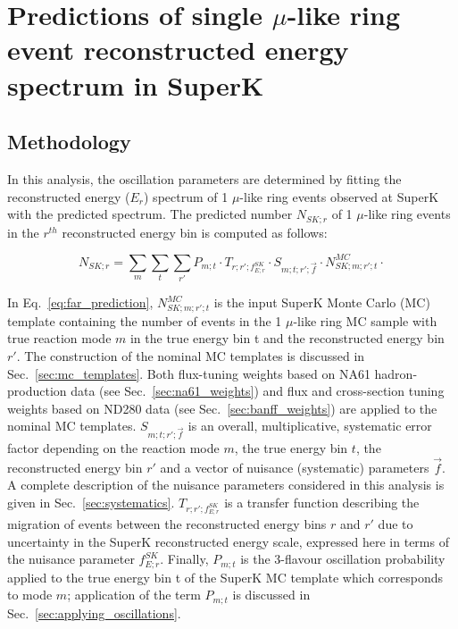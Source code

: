 \clearpage

\section {Predictions of single $\mu$-like ring event reconstructed energy spectrum in SuperK}
\label{sec:spectrum_prediction}

\subsection {Methodology}

In this analysis, 
the oscillation parameters are determined 
by fitting the reconstructed energy ($E_{r}$) spectrum
of 1 $\mu$-like ring events observed at SuperK with the predicted spectrum.
The predicted number $N_{SK;r}$ 
of 1 $\mu$-like ring events in the $r^{th}$ reconstructed energy bin
is computed as follows:

\begin{equation}
\displaystyle
  N_{SK;r} = 
    \sum_{m} \sum_{t} \sum_{r\prime}
        P_{m;t} \cdot
        T_{r;r\prime;f_{E; r}^{SK}} \cdot
        S_{m;t;r\prime;\vec{f}} \cdot
        N_{SK;m;r\prime;t}^{MC} \cdot
\label{eq:far_prediction}
\end{equation}

In Eq.\ \ref{eq:far_prediction}, $N_{SK;m;r\prime;t}^{MC}$ is the input SuperK Monte Carlo (MC) template 
containing the number of events in the 1 $\mu$-like ring MC sample with true reaction mode $m$ in the 
true energy bin t and the reconstructed energy bin $r\prime$.
The construction of the nominal MC templates is discussed in Sec.\ \ref{sec:mc_templates}.
Both flux-tuning weights based on NA61 hadron-production data (see Sec.\ \ref{sec:na61_weights})
and flux and cross-section tuning weights based on ND280 data (see Sec.\ \ref{sec:banff_weights})
are applied to the nominal MC templates.
$S_{m;t;r\prime;\vec{f}}$ is an overall, multiplicative, systematic error factor 
depending on the reaction mode $m$, the true energy bin $t$, the reconstructed energy bin $r\prime$ 
and a vector of nuisance (systematic) parameters $\vec{f}$. 
A complete description of the nuisance parameters considered in this analysis is given in Sec.\ \ref{sec:systematics}.
$T_{r;r\prime;f_{E; r}^{SK}}$ is a transfer function describing the migration of events
between the reconstructed energy bins $r$ and $r\prime$ due to uncertainty in the SuperK reconstructed energy
scale, expressed here in terms of the nuisance parameter $f_{E; r}^{SK}$.
Finally, $P_{m;t}$ is the 3-flavour oscillation probability applied to the true energy
bin t of the SuperK MC template which corresponds to mode $m$;
application of the term $P_{m;t}$ is discussed in Sec.\ \ref{sec:applying_oscillations}.

